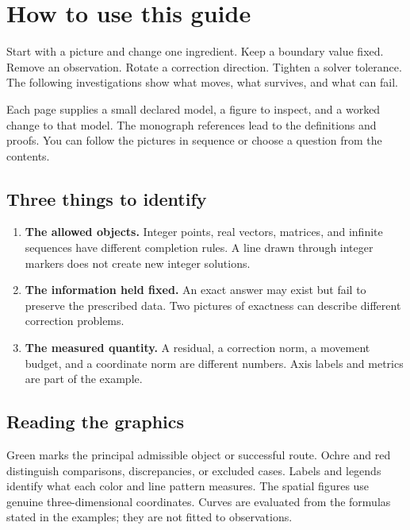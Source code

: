 \documentclass[11pt]{article}
\begin{document}
\KomorebiCover

\begingroup
\makeatletter
\renewcommand{\@pnumwidth}{3em}
\renewcommand{\@tocrmarg}{4em}
\makeatother
\tableofcontents
\endgroup
\clearpage{}
\section*{How to use this guide}
Start with a picture and change one ingredient. Keep a boundary value fixed. Remove an observation. Rotate a correction direction. Tighten a solver tolerance. The following investigations show what moves, what survives, and what can fail.

Each page supplies a small declared model, a figure to inspect, and a worked change to that model. The monograph references lead to the definitions and proofs. You can follow the pictures in sequence or choose a question from the contents.

\subsection*{Three things to identify}
\begin{enumerate}
\item \textbf{The allowed objects.} Integer points, real vectors, matrices, and infinite sequences have different completion rules. A line drawn through integer markers does not create new integer solutions.
\item \textbf{The information held fixed.} An exact answer may exist but fail to preserve the prescribed data. Two pictures of exactness can describe different correction problems.
\item \textbf{The measured quantity.} A residual, a correction norm, a movement budget, and a coordinate norm are different numbers. Axis labels and metrics are part of the example.
\end{enumerate}

\subsection*{Reading the graphics}
Green marks the principal admissible object or successful route. Ochre and red distinguish comparisons, discrepancies, or excluded cases. Labels and legends identify what each color and line pattern measures. The spatial figures use genuine three-dimensional coordinates. Curves are evaluated from the formulas stated in the examples; they are not fitted to observations.
\end{document}

